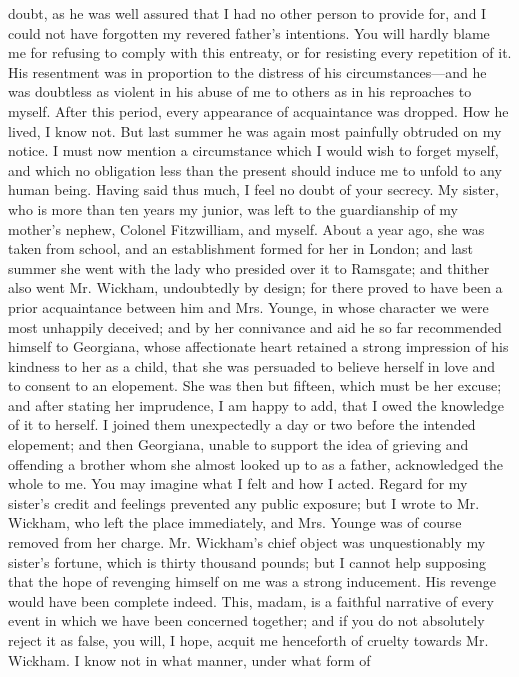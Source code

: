\documentclass[10pt]{book}
\begin{document}
doubt, as he was well assured that I had no other person to provide for,
and I could not have forgotten my revered father’s intentions. You will
hardly blame me
   for refusing to comply with this entreaty, or for
resisting every repetition of it. His resentment was in proportion to
the distress of his circumstances—and he was doubtless as violent in
his abuse of me to others as in his reproaches to myself. After this
period, every appearance of acquaintance was dropped. How he lived, I
know not. But last summer he was again most painfully obtruded on my
notice. I must now mention a circumstance which I would wish to forget
myself, and which no obligation less than the present should induce me
to unfold to any human being. Having said thus much, I feel no doubt of
your secrecy. My sister, who is more than ten years my junior, was left
to the guardianship of my mother’s nephew, Colonel Fitzwilliam, and
myself. About a year ago, she was taken from school, and an
establishment formed for her in London; and last summer she went with
the lady who presided over it to Ramsgate; and thither also went Mr.
Wickham, undoubtedly by design; for there proved to have been a prior
acquaintance between him and Mrs. Younge, in whose character we were
most unhappily deceived; and by her connivance and aid he so far
recommended himself to Georgiana, whose affectionate heart retained a
strong impression of his kindness to her as a child, that she was
persuaded to believe herself in love and to consent to an elopement. She
was then but fifteen, which must be her excuse; and after stating her
imprudence, I am happy to add, that I owed the knowledge of it to
herself. I joined them unexpectedly a day or two before the intended
elopement; and then Georgiana, unable to support the idea of grieving
and offending a brother whom she almost looked up to as a father,
acknowledged the whole to me. You may imagine what
   I felt and how I
acted. Regard for my sister’s credit and feelings prevented any public
exposure; but I wrote to Mr. Wickham, who left the place immediately,
and Mrs. Younge was of course removed from her charge. Mr. Wickham’s
chief object was unquestionably my sister’s fortune, which is thirty
thousand pounds; but I cannot help supposing that the hope of revenging
himself on me was a strong inducement. His revenge would have been
complete indeed. This, madam, is a faithful narrative of every event in
which we have been concerned together; and if you do not absolutely
reject it as false, you will, I hope, acquit me henceforth of cruelty
towards Mr. Wickham. I know not in what manner, under what form of
\end{document}
